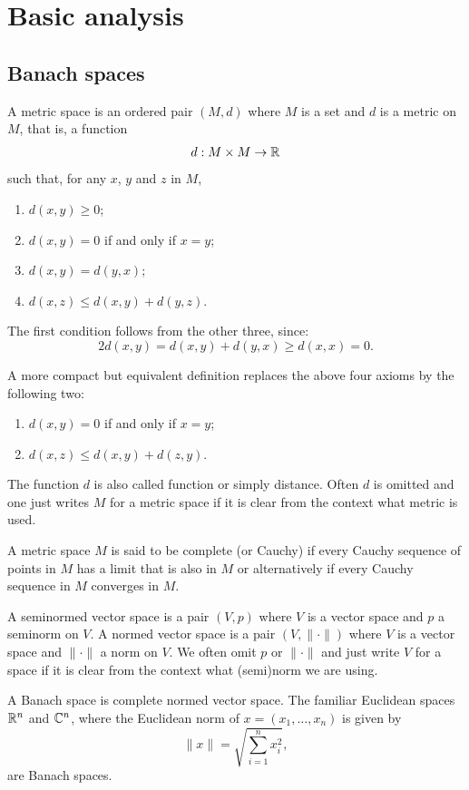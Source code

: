 \chapter{Basic analysis}

\section{Banach spaces}

A metric space is an ordered pair $(M,d)$ where
$M$ is a set and $d$ is a metric on $M$, that is, a function
\[
    d : M \times M \rightarrow \mathbb{R}
\]
such that, for any $x$, $y$ and $z$ in $M$,
\begin{enumerate}
\item
$d(x, y) \geq 0$;
\item
$d(x, y) = 0$   if and only if   $x = y$;
\item
$d(x, y) = d(y, x)$;
\item
$d(x, z) \leq d(x, y) + d(y, z)$.
\end{enumerate}
The first condition follows from the other three, since:
\[
    2d(x, y) = d(x, y) + d(y, x) \geq d(x,x) = 0.
\]

A more compact but equivalent definition replaces the above four
axioms by the following two:
\begin{enumerate}
\item
$d(x, y) = 0$  if and only if $x = y$;
\item
$d(x, z) \leq d(x, y) + d(z, y)$.
\end{enumerate}
The function $d$ is also called  function or simply
distance.
Often $d$ is omitted and one just writes $M$ for a metric space if it
is clear from the context what metric is used.

A metric space $M$ is said to be complete (or
Cauchy) if every Cauchy sequence of points in $M$ has a limit that is
also in $M$ or alternatively if every Cauchy sequence in $M$ converges in
$M$.

A seminormed vector space is a pair $(V,p)$
where $V$ is a vector space and $p$ a seminorm on $V$.
A normed vector space is a pair $(V,\|\cdot\|)$ where
$V$ is a vector space and $\|\cdot\|$ a norm on $V$.
We often omit $p$ or $\|\cdot\|$ and just write $V$ for a space if it is
clear from the context what (semi)norm we are using.

A Banach space is complete normed vector space.
The familiar Euclidean spaces $\mathbb{R}^n$ and $\mathbb{C}^n$, where the Euclidean
norm of $x = (x_1,\ldots, x_n)$ is given by
\[
\|x\| = \sqrt{\sum_{i=1}^n x_i^2},
\]
are Banach spaces.

